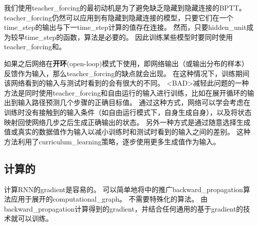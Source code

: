 我们使用\gls{teacher_forcing}的最初动机是为了避免缺乏隐藏到隐藏连接的\gls{BPTT}。
\gls{teacher_forcing}仍然可以应用到有隐藏到隐藏连接的模型，只要它们在一个\gls{time_step}的输出与下一\gls{time_step}计算的值存在连接。
然而，只要\gls{hidden_unit}成为较早\gls{time_step}的函数，算法是必要的。
因此训练某些模型时要同时使用\gls{teacher_forcing}和。


如果之后网络在\textbf{开环}(open-loop)模式下使用，即网络输出（或输出分布的样本）反馈作为输入，那么\gls{teacher_forcing}的缺点就会出现。
在这种情况下，训练期间该网络看到的输入与测试时看到的会有很大的不同。
<BAD>减轻此问题的一种方法是同时使用\gls{teacher_forcing}和自由运行的输入进行训练，比如在展开循环的输出到输入路径预测几个步骤的正确目标值。
通过这种方式，网络可以学会考虑在训练时没有接触到的输入条件（如自由运行模式下，自身生成自身），以及将状态映射回使网络几步之后生成正确输出的状态。
另外一种方式\citep{SamyBengio-et-al-arxiv2015}是通过随意选择生成值或真实的数据值作为输入以减小训练时和测试时看到的输入之间的差别。
这种方法利用了\gls{curriculum_learning}策略，逐步使用更多生成值作为输入。

\subsection{计算的}
\label{sec:computing_the_gradient_in_a_recurrent_neural_network}
计算\gls{RNN}的\gls{gradient}是容易的。
可以简单地将中的推广\gls{backward_propagation}算法应用于展开的\gls{computational_graph}。
不需要特殊化的算法。
由\gls{backward_propagation}计算得到的\gls{gradient}，并结合任何通用的基于\gls{gradient}的技术就可以训练。

